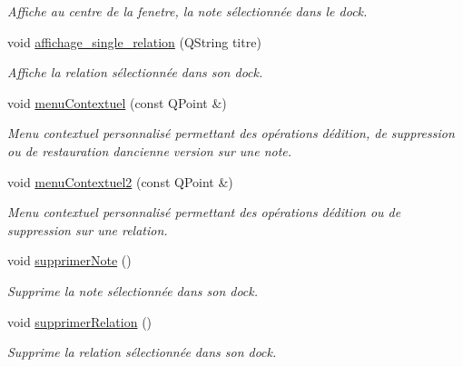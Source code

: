 \begin{DoxyCompactItemize}
\begin{DoxyCompactList}\small\item\em Affiche au centre de la fenetre, la note sélectionnée dans le dock. \end{DoxyCompactList}\item 
void \hyperlink{class_fen_principale_a67e142066003277638ed8b7dc67b19e9}{affichage\+\_\+single\+\_\+relation} (Q\+String titre)
\begin{DoxyCompactList}\small\item\em Affiche la relation sélectionnée dans son dock. \end{DoxyCompactList}\item 
\mbox{\label{class_fen_principale_a55596abf1539b9b6012fc89f0e9c3d6a}} 
void \hyperlink{class_fen_principale_a55596abf1539b9b6012fc89f0e9c3d6a}{menu\+Contextuel} (const Q\+Point \&)
\begin{DoxyCompactList}\small\item\em Menu contextuel personnalisé permettant des opérations d\textquotesingle{}édition, de suppression ou de restauration d\textquotesingle{}ancienne version sur une note. \end{DoxyCompactList}\item 
\mbox{\label{class_fen_principale_a6518d75ce88927fbd121e465bae896f4}} 
void \hyperlink{class_fen_principale_a6518d75ce88927fbd121e465bae896f4}{menu\+Contextuel2} (const Q\+Point \&)
\begin{DoxyCompactList}\small\item\em Menu contextuel personnalisé permettant des opérations d\textquotesingle{}édition ou de suppression sur une relation. \end{DoxyCompactList}\item 
\mbox{\label{class_fen_principale_abdbd0250f3c3e037bfa7cd27c5162baf}} 
void \hyperlink{class_fen_principale_abdbd0250f3c3e037bfa7cd27c5162baf}{supprimer\+Note} ()
\begin{DoxyCompactList}\small\item\em Supprime la note sélectionnée dans son dock. \end{DoxyCompactList}\item 
void \hyperlink{class_fen_principale_a7dbafe44ea212955ba0b7d674ab5cc9d}{supprimer\+Relation} ()
\begin{DoxyCompactList}\small\item\em Supprime la relation sélectionnée dans son dock. \end{DoxyCompactList}\item 

\end{DoxyCompactItemize}
